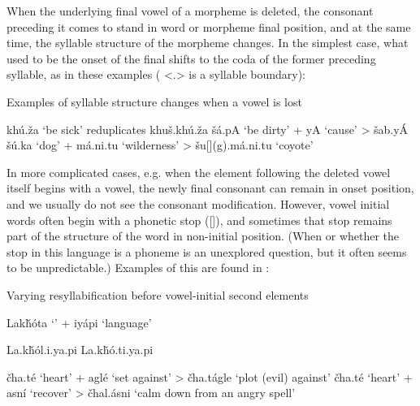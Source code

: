 \documentclass[output=paper]{LSP/langsci}
\begin{document}
When the underlying final vowel of a morpheme is deleted, the consonant preceding it comes to stand in word or morpheme final position, and at the same time, the syllable structure of the morpheme changes. In the simplest case, what used to be the onset of the final shifts to the coda of the former preceding syllable, as in these examples ( <.> is a syllable boundary):

\begin{exe}
\ex\label{ex:rood:12} Examples of syllable structure changes when a vowel is lost
\begin{xlist}
\ex kh\'u.\v{z}a `be sick' reduplicates khu\v{s}.kh\'u.\v{z}a
\ex \v{s}\'a.pA `be dirty' + yA `cause' > \v{s}ab.y\'A
\ex \v{s}\'u.ka `dog' + m\'a.ni.tu `wilderness' > \v{s}u[](g).m\'a.ni.tu `coyote'
\end{xlist}
\end{exe}

In more complicated cases, e.g. when the element following the deleted vowel itself begins with a vowel, the newly final consonant can remain in onset position, and we usually do not see the consonant modification. However, vowel initial words often begin with a phonetic  stop ([]), and sometimes that  stop remains part of the structure of the word in non-initial position. (When or whether the  stop in this language is a phoneme is an unexplored question, but it often seems to be unpredictable.) Examples of this are found in :

\begin{exe}
\ex \label{ex:rood:13}Varying resyllabification before vowel-initial second elements
\begin{xlist}
\ex Lak\v{h}\'ota `' + iy\'api `language'
\begin{xlist}
\ex La.k\v{h}\'ol.i.ya.pi
\ex La.k\v{h}\'o.ti.ya.pi
\end{xlist}
\ex 
\begin{xlist}
\ex \v{c}ha.t\'e `heart' + agl\'e `set against' > \v{c}ha.t\'agle `plot (evil) against'
\ex \v{c}ha.t\'e `heart' + asn\'i `recover' > \v{c}hal.\'asni `calm down from an angry spell'
\end{xlist}
\end{xlist}
\end{exe}
\end{document}
